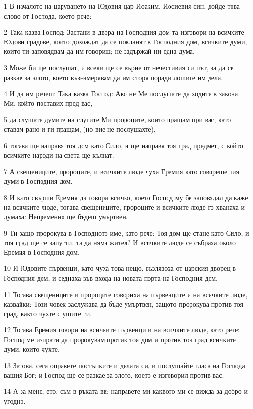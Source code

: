 \par 1 В началото на царуването на Юдовия цар Иоаким, Иосиевия син, дойде това слово от Господа, което рече:
\par 2 Така казва Господ: Застани в двора на Господния дом та изговори на всичките Юдови градове, които дохождат да се покланят в Господния дом, всичките думи, които ти заповядвам да им говориш; не задържай ни една дума.
\par 3 Може би ще послушат, и всеки ще се върне от нечестивия си път, за да се разкае за злото, което възнамерявам да им сторя поради лошите им дела.
\par 4 И да им речеш: Така казва Господ: Ако не Ме послушате да ходите в закона Ми, който поставих пред вас,
\par 5 да слушате думите на слугите Ми пророците, които пращам при вас, като ставам рано и ги пращам, (но вие не послушахте),
\par 6 тогава ще направя тоя дом като Сило, и ще направя тоя град предмет, с който всичките народи на света ще кълнат.
\par 7 А свещениците, пророците, и всичките люде чуха Еремия като говореше тия думи в Господния дом.
\par 8 И като свърши Еремия да говори всичко, което Господ му бе заповядал да каже на всичките люде, тогава свещениците, пророците и всичките люде го хванаха и думаха: Непременно ще бъдеш умъртвен.
\par 9 Ти защо пророкува в Господното име, като рече: Тоя дом ще стане като Сило, и тоя град ще се запусти, та да няма жител? И всичките люде се събраха около Еремия в Господния дом.
\par 10 И Юдовите първенци, като чуха това нещо, възлязоха от царския дворец в Господния дом, и седнаха във входа на новата порта на Господния дом.
\par 11 Тогава свещениците и пророците говориха на първенците и на всичките люде, казвайки: Този човек заслужава да бъде умъртвен, защото пророкува против тоя град, както чухте с ушите си.
\par 12 Тогава Еремия говори на всичките първенци и на всичките люде, като рече: Господ ме изпрати да пророкувам против тоя дом и против тоя град всичките думи, които чухте.
\par 13 Затова, сега оправете постъпките и делата си, и послушайте гласа на Господа вашия Бог; и Господ ще се разкае за злото, което е изговорил против вас.
\par 14 А за мене, ето, съм в ръката ви; направете ми каквото ми се вижда за добро и угодно.
